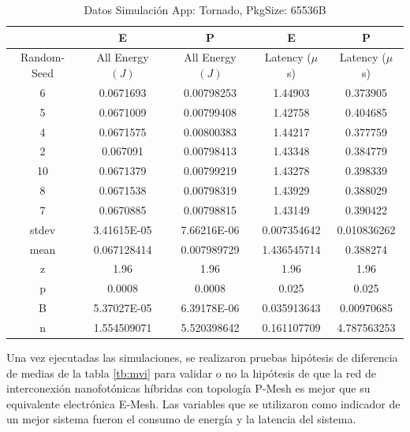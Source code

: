 \begin{table}[H]
\centering
\begin{tabular}{|c|c|c|c|c|}
\hline
 &E&P&E&P\\
\hline
Random-Seed&All Energy $(J)$&All Energy $(J)$&Latency ($\mu$ s)&Latency ($\mu$ s)\\
\hline
6&0.0671693&0.00798253&1.44903&0.373905\\
5&0.0671009&0.00799408&1.42758&0.404685\\
4&0.0671575&0.00800383&1.44217&0.377759\\
2&0.067091&0.00798413&1.43348&0.384779\\
10&0.0671379&0.00799219&1.43278&0.398339\\
8&0.0671538&0.00798319&1.43929&0.388029\\
7&0.0670885&0.00798815&1.43149&0.390422\\
\hline
stdev&3.41615E-05&7.66216E-06&0.007354642&0.010836262\\
mean&0.067128414&0.007989729&1.436545714&0.388274\\
z&1.96&1.96&1.96&1.96\\
p&0.0008&0.0008&0.025&0.025\\
B&5.37027E-05&6.39178E-06&0.035913643&0.00970685\\
\hline
n&1.554509071&5.520398642&0.161107709&4.787563253\\
\hline
\end{tabular}
\caption{Datos Simulación App: Tornado, PkgSize: 65536B}
\label{tb:st65k}
\end{table}

Una vez ejecutadas las simulaciones, se realizaron pruebas hipótesis de diferencia
de medias de la tabla \ref{tb:mvi} para validar o no la hipótesis de que la 
red de interconexión nanofotónicas híbridas con topología P-Mesh es mejor
que su equivalente electrónica E-Mesh.
Las variables que se utilizaron como indicador 
de un mejor sistema fueron el consumo de energía y la latencia del sistema.


